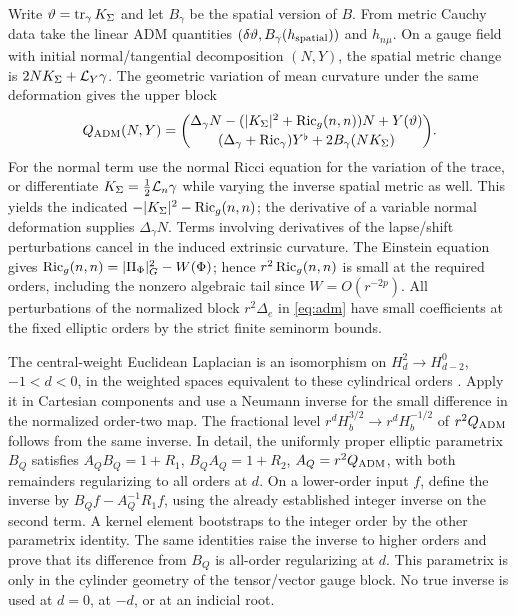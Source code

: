 Write \(\vartheta=\operatorname{tr}_\gamma K_\Sigma\) and let \(B_\gamma\) be the spatial version of \(B\). From metric Cauchy data take the linear ADM quantities \((\delta\vartheta,B_\gamma(h_{\rm spatial}))\) and \(h_{n\mu}\). On a gauge field with initial normal/tangential decomposition \((N,Y)\), the spatial metric change is \(2NK_\Sigma+\mathcal L_Y\gamma\). The geometric variation of mean curvature under the same deformation gives the upper block
\begin{equation}
 Q_{\rm ADM}(N,Y)=
 \binom{\Delta_\gamma N-(|K_\Sigma|^2+\operatorname{Ric}_g(n,n))N+Y(\vartheta)}
       {(\Delta_\gamma+\operatorname{Ric}_\gamma)Y^\flat+2B_\gamma(NK_\Sigma)} .
 \label{eq:adm}
\end{equation}
For the normal term use the normal Ricci equation for the variation of the trace, or differentiate \(K_\Sigma=\tfrac12\mathcal L_n\gamma\) while varying the inverse spatial metric as well. This yields the indicated \(-|K_\Sigma|^2-\operatorname{Ric}_g(n,n)\); the derivative of a variable normal deformation supplies \(\Delta_\gamma N\). Terms involving derivatives of the lapse/shift perturbations cancel in the induced extrinsic curvature. The Einstein equation gives \(\operatorname{Ric}_g(n,n)=|\Pi_\Phi|_G^2-W(\Phi)\); hence \(r^2\operatorname{Ric}_g(n,n)\) is small at the required orders, including the nonzero algebraic tail since \(W=O(r^{-2p})\). All perturbations of the normalized block \(r^2\Delta_e\) in \eqref{eq:adm} have small coefficients at the fixed elliptic orders by the strict finite seminorm bounds.

The central-weight Euclidean Laplacian is an isomorphism on \(H_d^{2}\to H_{d-2}^{0}\), \(-1<d<0\), in the weighted spaces equivalent to these cylindrical orders \cite[Thm.~1.7]{Bartnik}. Apply it in Cartesian components and use a Neumann inverse for the small difference in the normalized order-two map. The fractional level \(r^d H_b^{3/2}\to r^d H_b^{-1/2}\) of \(r^2Q_{\rm ADM}\) follows from the same inverse. In detail, the uniformly proper elliptic parametrix \(B_Q\) satisfies \(A_QB_Q=1+R_1\), \(B_QA_Q=1+R_2\), \(A_Q=r^2Q_{\rm ADM}\), with both remainders regularizing to all orders at \(d\). On a lower-order input \(f\), define the inverse by \(B_Qf-A_Q^{-1}R_1f\), using the already established integer inverse on the second term. A kernel element bootstraps to the integer order by the other parametrix identity. The same identities raise the inverse to higher orders and prove that its difference from \(B_Q\) is all-order regularizing at \(d\). This parametrix is only in the cylinder geometry of the tensor/vector gauge block. No true inverse is used at \(d=0\), at \(-d\), or at an indicial root.

